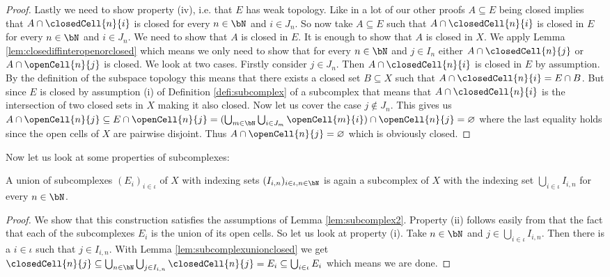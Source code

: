 \begin{proof}
    Lastly we need to show property (iv), i.e. that $E$ has weak topology. 
    Like in a lot of our other proofs $A \subseteq E$ being closed implies that $A \cap \closedCell{n}{i}$ is closed for every $n \in \bN$ and $i \in J_n$. 
    So now take $A \subseteq E$ such that $A \cap \closedCell{n}{i}$ is closed in $E$ for every $n \in \bN$ and $i \in J_n$. 
    We need to show that $A$ is closed in $E$.
    It is enough to show that $A$ is closed in $X$. 
    We apply Lemma \ref{lem:closediffinteropenorclosed} which means we only need to show that for every $n \in \bN$ and $j \in I_n$ either $A \cap \closedCell{n}{j}$ or $A \cap \openCell{n}{j}$ is closed. 
    We look at two cases. 
    Firstly consider $j \in J_n$. 
    Then $A \cap \closedCell{n}{i}$ is closed in $E$ by assumption.
    By the definition of the subspace topology this means that there exists a closed set $B \subseteq X$ such that $A \cap \closedCell{n}{i} = E \cap B$. 
    But since $E$ is closed by assumption (i) of Definition \ref{defi:subcomplex} of a subcomplex that means that $A \cap \closedCell{n}{i}$ is the intersection of two closed sets in $X$ making it also closed. 
    Now let us cover the case $j \notin J_n$. 
    This gives us $A \cap \openCell{n}{j} \subseteq E \cap \openCell{n}{j} = (\bigcup_{m \in \bN} \bigcup_{i \in J_m} \openCell{m}{i}) \cap \openCell{n}{j} = \varnothing$ where the last equality holds since the open cells of $X$ are pairwise disjoint. 
    Thus $A \cap \openCell{n}{j} = \varnothing$ which is obviously closed.
\end{proof}

Now let us look at some properties of subcomplexes: 

\begin{lem} \label{lem:unionsubcomplexes}
    A union of subcomplexes $(E_i)_{i \in \iota}$ of $X$  with indexing sets $(I_{i, n})_{i \in \iota, n \in \bN}$ is again a subcomplex of $X$ with the indexing set $\bigcup_{i \in \iota} I_{i, n}$ for every $n \in \bN$.
\end{lem}
\begin{proof}
    We show that this construction satisfies the assumptions of Lemma \ref{lem:subcomplex2}. 
    Property (ii) follows easily from that the fact that each of the subcomplexes $E_i$ is the union of its open cells. 
    So let us look at property (i).
    Take $n \in \bN$ and $j \in \bigcup_{i \in \iota} I_{i, n}$. 
    Then there is a $i \in \iota$ such that $j \in I_{i, n}$. 
    With Lemma \ref{lem:subcomplexunionclosed} we get 
    $\closedCell{n}{j} \subseteq \bigcup_{n \in \bN}\bigcup_{j \in I_{i, n}} \closedCell{n}{j} = E_i \subseteq \bigcup_{i \in \iota} E_i$ which means we are done.
\end{proof}

